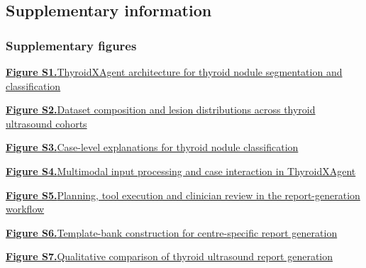 \documentclass[fleqn,10pt]{wlscirep}
\begin{document}
\clearpage
\begin{appendices}

\renewcommand{\thefigure}{S\arabic{figure}}
\renewcommand{\thetable}{S\arabic{table}}
\setcounter{figure}{0}
\setcounter{table}{0}

\section*{Supplementary information}
{}

\newcommand{\suppcontentsline}[3]{%
  \noindent\hyperref[#1]{\textbf{#2}}\enspace #3\dotfill\pageref{#1}\par
}

\subsubsection*{Supplementary figures}

\suppcontentsline{fig:ThyroidXAgent_for_seg_and_cls}{\hyperref[fig:ThyroidXAgent_for_seg_and_cls]{Figure S1.}}{\hyperref[fig:ThyroidXAgent_for_seg_and_cls]{ThyroidXAgent architecture for thyroid nodule segmentation and classification}}
\suppcontentsline{fig:SegCls_statistics}{\hyperref[fig:SegCls_statistics]{Figure S2.}}{\hyperref[fig:SegCls_statistics]{Dataset composition and lesion distributions across thyroid ultrasound cohorts}}

\suppcontentsline{fig:BM_cases}{\hyperref[fig:BM_cases]{Figure S3.}}{\hyperref[fig:BM_cases]{Case-level explanations for thyroid nodule classification}}

\suppcontentsline{fig:report_generation_multimodal_interface}{\hyperref[fig:report_generation_multimodal_interface]{Figure S4.}}{\hyperref[fig:report_generation_multimodal_interface]{Multimodal input processing and case interaction in ThyroidXAgent}}
\suppcontentsline{fig:report_generation_planning_execution_review}{\hyperref[fig:report_generation_planning_execution_review]{Figure S5.}}{\hyperref[fig:report_generation_planning_execution_review]{Planning, tool execution and clinician review in the report-generation workflow}}
\suppcontentsline{fig:report_generation_template_bank}{\hyperref[fig:report_generation_template_bank]{Figure S6.}}{\hyperref[fig:report_generation_template_bank]{Template-bank construction for centre-specific report generation}}
\suppcontentsline{fig:RG_CaseReview}{\hyperref[fig:RG_CaseReview]{Figure S7.}}{\hyperref[fig:RG_CaseReview]{Qualitative comparison of thyroid ultrasound report generation}}


\end{appendices}
\end{document}

